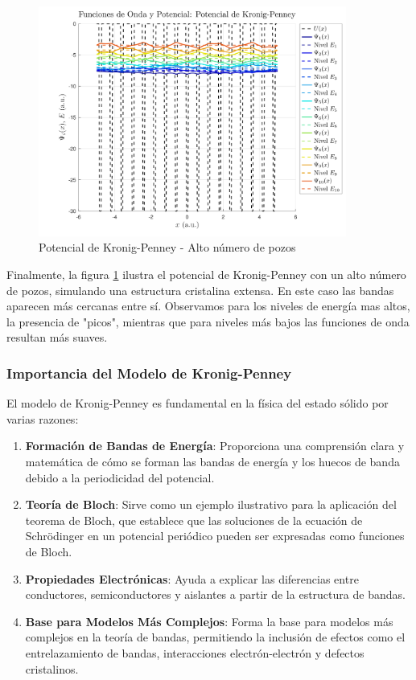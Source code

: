 \documentclass[a4paper,12pt]{article}
\begin{document}
\begin{figure}[H]
    \centering
    \includegraphics[width=0.9\textwidth]{img/Potencial_de_Kronig-Penney_high.png}
    \caption{Potencial de Kronig-Penney - Alto número de pozos}
    \label{fig:kronig_penney_high}
\end{figure}

Finalmente, la figura \ref{fig:kronig_penney_high} ilustra el potencial de Kronig-Penney con un alto número de pozos, simulando una estructura cristalina extensa. En este caso las bandas aparecen más cercanas entre sí. Observamos para los niveles de energía mas altos, la presencia de "picos", mientras que para niveles más bajos las funciones de onda resultan más suaves.

\subsubsection{Importancia del Modelo de Kronig-Penney}

El modelo de Kronig-Penney es fundamental en la física del estado sólido por varias razones:

\begin{enumerate}
    \item \textbf{Formación de Bandas de Energía}: Proporciona una comprensión clara y matemática de cómo se forman las bandas de energía y los huecos de banda debido a la periodicidad del potencial.
    
    \item \textbf{Teoría de Bloch}: Sirve como un ejemplo ilustrativo para la aplicación del teorema de Bloch, que establece que las soluciones de la ecuación de Schrödinger en un potencial periódico pueden ser expresadas como funciones de Bloch.
    
    \item \textbf{Propiedades Electrónicas}: Ayuda a explicar las diferencias entre conductores, semiconductores y aislantes a partir de la estructura de bandas.
    
    \item \textbf{Base para Modelos Más Complejos}: Forma la base para modelos más complejos en la teoría de bandas, permitiendo la inclusión de efectos como el entrelazamiento de bandas, interacciones electrón-electrón y defectos cristalinos.
\end{enumerate}
\end{document}
